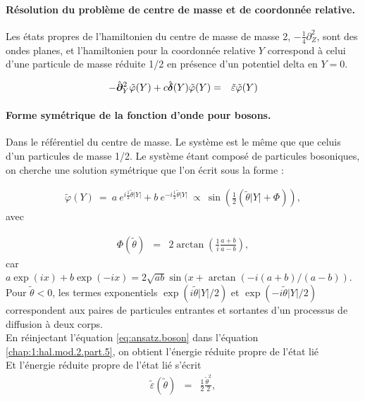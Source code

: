 \paragraph{Résolution du problème de centre de masse et de coordonnée relative.}
Les états propres de l'hamiltonien du centre de masse de masse 2, $-\frac{1}{4} \partial_Z^2$, sont des ondes planes, et l'hamiltonien pour la coordonnée relative $Y$ correspond à celui d'une particule de masse réduite 1/2 en présence d'un potentiel delta en $Y = 0$. 

\begin{eqnarray}\label{chap:1:hal.mod.2.part.5}
	- 	\hat{\bm{\partial}}_Y^2 \tilde{\varphi}(Y) + c \hat{\bm{\delta}} ( Y )\tilde{\varphi}(Y) & = & \tilde{\varepsilon}\tilde{\varphi}(Y) 
\end{eqnarray}
\paragraph{Forme symétrique de la fonction d'onde pour bosons.}
Dans le référentiel du centre de masse. Le système est le même que que celuis d'un particules de masse 1/2.
Le système étant composé de particules bosoniques, on cherche une solution symétrique que l’on écrit sous la forme  :


\begin{eqnarray}
	\tilde{\varphi}(Y) ~=~a~e^{i\frac{1}{2} \tilde{\theta} \vert Y \vert } + b~e^{-i\frac{1}{2} \tilde{\theta}\vert Y \vert } ~\propto~  \sin\left( \frac{1}{2} (\tilde{\theta} |Y| + \Phi ) \right), \label{eq:ansatz.boson}
\end{eqnarray}
avec  

\begin{eqnarray}
	\Phi(\tilde{\theta}) &=& 2 \arctan\left (\frac{1}{i} \frac{a+b}{a-b}\right),	\label{chap:1:dif.mod.2.part.1} 
\end{eqnarray}
car $a\exp(ix)+b\exp(-ix) = 2\sqrt{ab}\sin(x+\arctan(-i (a+b)/(a-b))$. Pour $\tilde{\theta}<0$, les termes exponentiels \( \exp(i\tilde{\theta} \vert Y \vert/2 ) \) et \( \exp(-i\tilde{\theta} \vert Y \vert/2 ) \) correspondent aux paires de particules entrantes et sortantes d’un processus de diffusion à deux corps.\\

En réinjectant l'équation \eqref{eq:ansatz.boson} dans l’équation \eqref{chap:1:hal.mod.2.part.5}, on obtient l’énergie réduite propre de l’état lié\\ %
{\color{blue} Et l’énergie réduite propre de l’état lié s'écrit } 
\begin{eqnarray}
	\tilde{\varepsilon}(\tilde{\theta})  & = &  \frac{1}{2}\frac{\tilde{\theta}^2}{2},	
\end{eqnarray}

